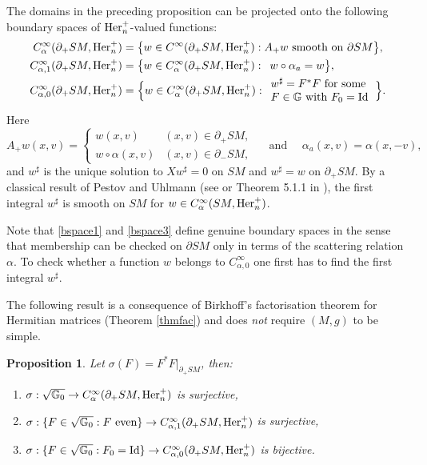 \documentclass[JEP,XML,SOM,Unicode,published]{cedram}
\theoremstyle{plain}
\newtheorem{proposition}[theorem]{Proposition}
\theoremstyle{definition}
\newcommand{\G}{\mathbb{G}}
\newcommand{\he}{\textup{Her}}
\newcommand{\Id}{\mathrm{Id}}
\newcommand{\1}{{\bf 1}}
\begin{document}
The domains in the preceding proposition can be projected onto the following boundary spaces of $\he^+_n$-valued functions:
\begin{align}
C_\alpha^\infty(\partial_+SM,\he^+_n)&= \bigl \{w\in C^\infty(\partial_+SM,\he^+_n):
A_+w \text{ smooth on } \partial SM
\bigr \}, \label{bspace1} \\
C_{\alpha,1}^\infty(\partial_+SM,\he^+_n) &= \bigl\{w\in C_\alpha^\infty(\partial_+SM,\he^+_n): ~\,w\circ\alpha_a = w \bigr\},\label{bspace3}\\
C_{\alpha,0}^\infty(\partial_+SM,\he^+_n)&=\Bigl\{ w\in C_\alpha^\infty(\partial_+SM,\he^+_n):
\begin{array}{l}
w^\sharp =F^*F \text{ for some } \\ F\in \G \text{ with } F_0 =\Id
\end{array}
\Bigr\}.
\label{bspace2}
\end{align}
Here
\begin{equation}\label{someas}
A_+w(x,v) =\begin{cases}
w(x,v)& (x,v)\in \partial_+SM,\\
w\circ \alpha(x,v) & (x,v) \in \partial_-SM,
\end{cases}
\quad \text{ and } \quad \alpha_a(x,v) = \alpha(x,-v),
\end{equation}
and $w^\sharp$ is the unique solution to $Xw^\sharp =0$ on $SM$ and $w^\sharp = w$ on $\partial_+ SM$. By a classical result of Pestov and Uhlmann (see \cite{PeUh04} or Theorem 5.1.1 in \cite{PSU20}), the first integral $w^\sharp$ is smooth on $SM$ for $w\in C_\alpha^\infty(SM,\he_n^+)$.

Note that \eqref{bspace1} and \eqref{bspace3} define genuine boundary spaces in the sense that membership can be checked on $\partial SM$ only in terms of the scattering relation $\alpha$. To check whether a function $w$ belongs to $C_{\alpha,0}^\infty$ one first has to find the first integral $w^\sharp$.

\smallskip

The following result is a consequence of Birkhoff's factorisation theorem for Hermitian matrices (Theorem \ref{thmfac}) and does \emph{not} require $(M,g)$ to be simple.

\begin{proposition} \label{sigma} Let $\sigma(F)= F^*F\vert_{\partial_+SM}$, then:
\begin{enumerate}
\item \label{sigma1} $\sigma:\sqrt{\G_0} \to C_\alpha^\infty(\partial_+SM,\he^+_n)$ is surjective,
\item \label{sigma3} $\sigma:\{F\in \sqrt{\G_0}: F~{\rm even}\} \to C_{\alpha,1}^\infty(\partial_+SM,\he^+_n)$ is surjective,
\item \label{sigma2} $\sigma:\{F\in \sqrt{\G_0}: F_0=\Id\}\to C_{\alpha,0}^\infty(\partial_+SM,\he^+_n)$ is bijective.
\end{enumerate}
\end{proposition}
\end{document}
